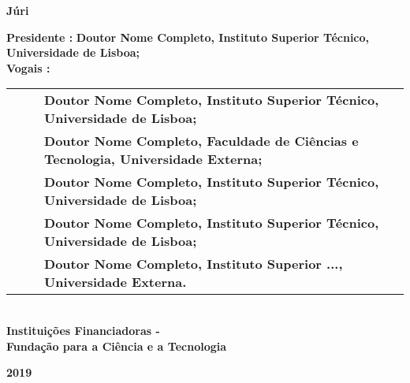 \begin{flushleft}
\vspace{8mm}
\Large \textbf{Júri}\\
\vspace{2mm}
\raggedright\Large \textbf{Presidente :}  \textbf{Doutor Nome Completo, Instituto Superior Técnico, Universidade de Lisboa;}\\
\Large \textbf{Vogais :}\\
\vspace{2mm}
\begin{minipage}{\textwidth}
\begin{tabularx}{1.1\textwidth}{ l @{ } p{} }
~~~ & \textbf{Doutor Nome Completo, Instituto Superior Técnico, Universidade de Lisboa;}\\
 & \textbf{Doutor Nome Completo, Faculdade de Ciências e Tecnologia, Universidade Externa;}\\
 & \textbf{Doutor Nome Completo, Instituto Superior Técnico, Universidade de Lisboa;}\\
 & \textbf{Doutor Nome Completo, Instituto Superior Técnico, Universidade de Lisboa;}\\
 & \textbf{Doutor Nome Completo, Instituto Superior ..., Universidade Externa.}\\
\end{tabularx}
\end{minipage}\\
\centering
\vspace{5mm}\Large \textbf{Instituições Financiadoras -\\ Fundação para a Ciência e a Tecnologia}\\
%
\vspace{10mm}

\Large \textbf{2019} \\
\let\thepage\relax
\end{flushleft}
\pagebreak
